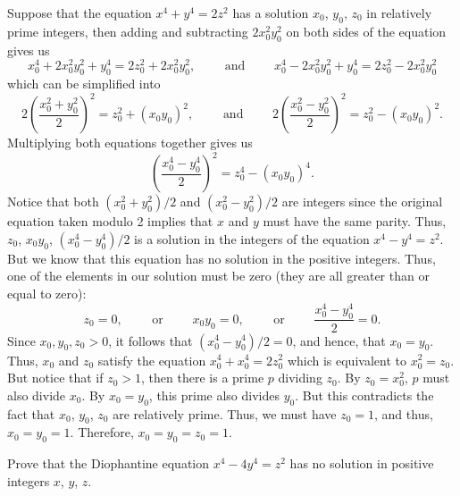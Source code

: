 
\begin{solution}
    Suppose that the equation $x^4 + y^4 = 2z^2$ has a solution $x_0$, $y_0$, $z_0$ in relatively prime integers, then adding and subtracting $2x_0^2y_0^2$ on both sides of the equation gives us 
    $$x_0^4 + 2x_0^2y_0^2 + y_0^4 = 2z_0^2 + 2x_0^2y_0^2, \qquad \text{ and } \qquad x_0^4 - 2x_0^2y_0^2 + y_0^4 = 2z_0^2 - 2x_0^2y_0^2$$
    which can be simplified into
    $$2\left(\frac{x_0^2 + y_0^2}{2}\right)^2 = z_0^2 + (x_0y_0)^2, \qquad \text{ and } \qquad 2\left(\frac{x_0^2 - y_0^2}{2}\right)^2 = z_0^2 - (x_0y_0)^2.$$
    Multiplying both equations together gives us
    $$\left(\frac{x_0^4 - y_0^4}{2}\right)^2 = z_0^4 - (x_0y_0)^4.$$
    Notice that both $(x_0^2 + y_0^2)/2$ and $(x_0^2 - y_0^2)/2$ are integers since the original equation taken modulo 2 implies that $x$ and $y$ must have the same parity. Thus, $z_0$, $x_0y_0$, $(x_0^4 - y_0^4)/2$ is a solution in the integers of the equation $x^4 - y^4 = z^2$. But we know that this equation has no solution in the positive integers. Thus, one of the elements in our solution must be zero (they are all greater than or equal to zero):
    $$z_0 = 0, \qquad \text{ or } \qquad x_0y_0 = 0, \qquad \text{ or } \qquad \frac{x_0^4 - y_0^4}{2} = 0.$$
    Since $x_0, y_0, z_0 > 0$, it follows that $(x_0^4 - y_0^4)/2 = 0$, and hence, that $x_0 = y_0$. Thus, $x_0$ and $z_0$ satisfy the equation $x_0^4 + x_0^4 = 2z_0^2$ which is equivalent to $x_0^2 = z_0$. But notice that if $z_0 > 1$, then there is a prime $p$ dividing $z_0$. By $z_0 = x_0^2$, $p$ must also divide $x_0$. By $x_0 = y_0$, this prime also divides $y_0$. But this contradicts the fact that $x_0$, $y_0$, $z_0$ are relatively prime. Thus, we must have $z_0 = 1$, and thus, $x_0 = y_0 = 1$. Therefore, $x_0 = y_0 = z_0 = 1$. \\
\end{solution}

\begin{exercise}
    Prove that the Diophantine equation $x^4 - 4y^4 = z^2$ has no solution in positive integers $x$, $y$, $z$.  \\
\end{exercise}

